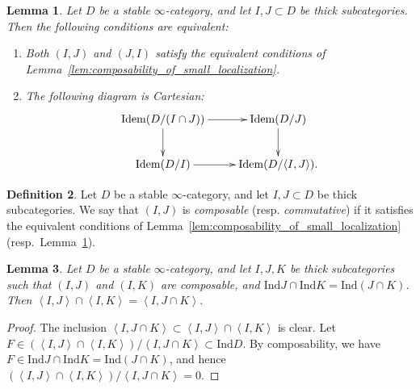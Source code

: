 \documentclass[11pt]{amsart}
\theoremstyle{definition}
\newtheorem{defn}{Definition}[section]
\theoremstyle{plain}
\newtheorem{lem}[defn]{Lemma}
\theoremstyle{remark}
\newcommand{\Idem}{\mathrm{Idem}}
\newcommand{\Ind}{\mathrm{Ind}}
\newcommand{\ang}[1]{{\left\langle{#1}\right\rangle}}
\numberwithin{equation}{section}
\begin{document}
\begin{lem}\label{lem:commutativity_of_small_localization}
Let \(D\) be a stable \(\infty\)-category, and let \(I,J\subset D\) be thick subcategories.
Then the following conditions are equivalent:
\begin{enumerate}
\item Both \((I,J)\) and \((J,I)\) satisfy the equivalent conditions of Lemma~\ref{lem:composability_of_small_localization}.
\item The following diagram is Cartesian:
\[
\xymatrix{
\Idem(D/(I\cap J))\ar[d]\ar[r]&\Idem(D/J)\ar[d]\\
\Idem(D/I)\ar[r]&\Idem(D/\ang{I,J}).
}
\]
\end{enumerate}
\end{lem}


\begin{defn}
Let \(D\) be a stable \(\infty\)-category, and let \(I,J\subset D\) be thick subcategories.
We say that \((I,J)\) is \emph{composable} (resp. \emph{commutative}) if it satisfies the equivalent conditions of Lemma~\ref{lem:composability_of_small_localization} (resp.~Lemma~\ref{lem:commutativity_of_small_localization}).
\end{defn}

\begin{lem}\label{lem:submodule_reconstruction}
Let \(D\) be a stable \(\infty\)-category, and let \(I,J,K\) be thick subcategories such that \((I,J)\) and \((I,K)\) are composable, and \(\Ind J\cap \Ind K=\Ind (J\cap K)\).  
Then \(\ang{I,J}\cap \ang{I,K}=\ang{I,J\cap K}\).
\end{lem}
\begin{proof}
The inclusion \(\ang{I,J\cap K}\subset \ang{I,J}\cap \ang{I,K}\) is clear.  
Let \(F\in (\ang{I,J}\cap \ang{I,K})/\ang{I,J\cap K}\subset \Ind D\).  
By composability, we have \(F\in \Ind J\cap \Ind K=\Ind(J\cap K)\),  
and hence \((\ang{I,J}\cap \ang{I,K})/\ang{I,J\cap K}=0\).
\end{proof}
\end{document}
